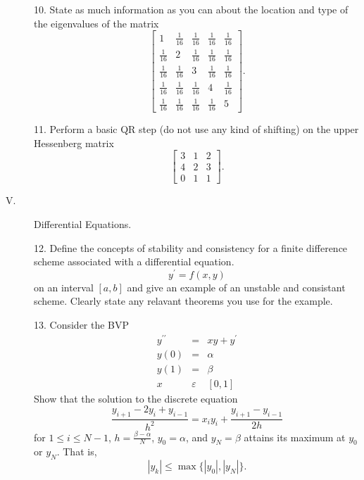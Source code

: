 \documentclass{article}
\begin{document}
\begin{description}
\item[\quad] 10.
State as much information as you can about the location and type of the
eigenvalues of the matrix
$$\left[\begin{array}{ccccc}
        1 & \frac{1}{16} & \frac{1}{16} &\frac{1}{16} &\frac{1}{16} \\
        \frac{1}{16} & 2 & \frac{1}{16} &\frac{1}{16} &\frac{1}{16} \\
        \frac{1}{16} &\frac{1}{16} & 3 & \frac{1}{16} &\frac{1}{16} \\
        \frac{1}{16} &\frac{1}{16} &\frac{1}{16} &4& \frac{1}{16}  \\
        \frac{1}{16} &\frac{1}{16} &\frac{1}{16} &\frac{1}{16} & 5 
        \end{array}
        \right].$$

\item[\quad] 11.
Perform a basic QR step (do not use any kind of shifting) on the upper
Hessenberg matrix
$$\left[\begin{array}{ccc}
        3&1&2 \\
        4&2&3 \\
        0&1&1 
        \end{array}
        \right].$$

\item[V.]
Differential Equations.

\item[\quad] 12.
Define the concepts of stability and consistency for a finite difference
scheme associated with a differential equation.
$$y^\prime = f(x,y)$$
on an interval $[a,b]$ and give an example of an unstable and consistant
scheme. Clearly state any relavant theorems you use for the example.

\item[\quad] 13.
Consider the BVP
$$\begin{array}{ccc}
        y^{\prime \prime} &=& xy + y^\prime \\
        y(0) &=& \alpha \\
        y(1) &=& \beta \\
        x &\varepsilon& [0,1]
        \end{array}$$
Show that the solution to the discrete equation
$$\frac{y_{i+1} - 2y_i + y_{i-1}}{h^2} = x_iy_i +
  \frac{y_{i+1} - y_{i-1}}{2h}$$
for $1 \leq i \leq N-1$, $h= \frac{\beta - \alpha}{N}$, $y_0 = \alpha$,
and $y_N = \beta$ attains its maximum at $y_0$ or $y_N$. That is,
$$|y_k| \leq \max\{|y_0|, |y_N|\}.$$


\end{description}
\end{document}
